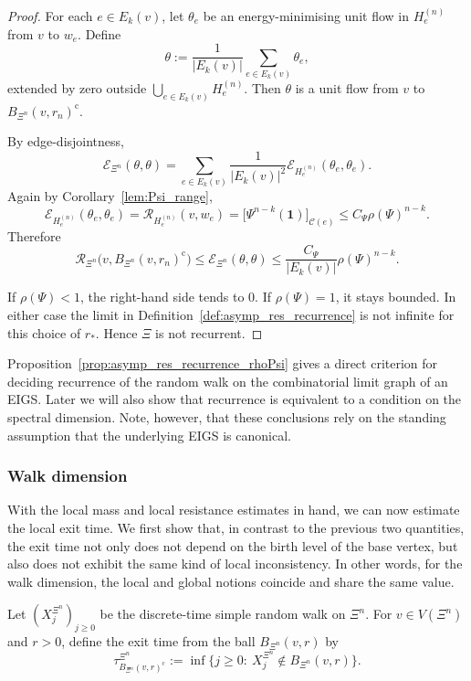 \documentclass{article}
\theoremstyle{plain}
\theoremstyle{definition}
\newcommand{\Reff}{\mathscr{R}}
\begin{document}
\begin{proof}
\begingroup\color{red}
For each $e\in E_k(v)$, let $\theta_e$ be an energy-minimising unit
flow in $H_e^{(n)}$ from $v$ to $w_e$. Define
\[
\theta:=\frac{1}{|E_k(v)|}\sum_{e\in E_k(v)}\theta_e,
\]
extended by zero outside $\bigcup_{e\in E_k(v)}H_e^{(n)}$.
Then $\theta$ is a unit flow from $v$ to $B_{\Xi^n}(v,r_n)^{\mathrm c}$.
\endgroup{}

By edge-disjointness,
\[
\mathcal E_{\Xi^n}(\theta,\theta)
=
\sum_{e\in E_k(v)}
\frac{1}{|E_k(v)|^2}\mathcal E_{H_e^{(n)}}(\theta_e,\theta_e).
\]
\begingroup\color{red}
Again by Corollary~\ref{lem:Psi_range},
\[
\mathcal E_{H_e^{(n)}}(\theta_e,\theta_e)
=\Reff_{H_e^{(n)}}(v,w_e)
=\bigl[\Psi^{n-k}(\mathbf1)\bigr]_{\mathscr C(e)}
\le C_\Psi\rho(\Psi)^{n-k}.
\]
Therefore
\[
\Reff_{\Xi^n}\bigl(v,B_{\Xi^n}(v,r_n)^{\mathrm c}\bigr)
\le\mathcal E_{\Xi^n}(\theta,\theta)
\le\frac{C_\Psi}{|E_k(v)|}\rho(\Psi)^{n-k}.
\]
\endgroup{}

If $\rho(\Psi)<1$, the right-hand side tends to $0$.
If $\rho(\Psi)=1$, it stays bounded.
In either case the limit in Definition~\ref{def:asymp_res_recurrence} is not infinite for this choice of $r_*$.
Hence $\Xi$ is not recurrent.
\end{proof}

Proposition~\ref{prop:asymp_res_recurrence_rhoPsi} gives a direct criterion for deciding recurrence of the random walk on the combinatorial limit graph of an EIGS.
Later we will also show that recurrence is equivalent to a condition on the spectral dimension.
Note, however, that these conclusions rely on the standing assumption that the underlying EIGS is canonical.

\subsubsection*{Walk dimension}

With the local mass and local resistance estimates in hand, we can now estimate the local exit time.
We first show that, in contrast to the previous two quantities, the exit time not only does not depend on the birth level of the base vertex, but also does not exhibit the same kind of local inconsistency.
In other words, for the walk dimension, the local and global notions coincide and share the same value.

Let $(X_j^{\Xi^n})_{j\ge 0}$ be the discrete-time simple random walk on $\Xi^n$.
For $v\in V(\Xi^n)$ and $r>0$, define the exit time from the ball $B_{\Xi^n}(v,r)$ by
\[
\tau_{B_{\Xi^n}(v,r)^{\mathrm c}}^{\Xi^n}
:=
\inf\{j\ge 0:\ X_j^{\Xi^n}\notin B_{\Xi^n}(v,r)\}.
\]
\end{document}
